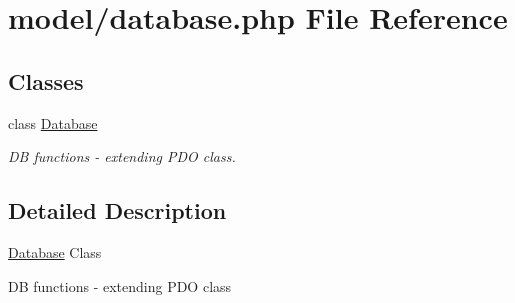 \hypertarget{database_8php}{\section{model/database.php File Reference}
\label{database_8php}
}
\subsection*{Classes}
\begin{DoxyCompactItemize}
\item 
class \hyperlink{classDatabase}{Database}
\begin{DoxyCompactList}\small\item\em D\-B functions -\/ extending P\-D\-O class. \end{DoxyCompactList}\end{DoxyCompactItemize}


\subsection{Detailed Description}
\hyperlink{classDatabase}{Database} Class

D\-B functions -\/ extending P\-D\-O class 